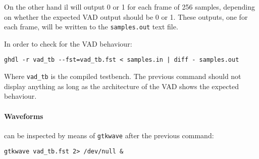 On the other hand il will output 0 or 1 for each frame of 256 samples, depending
on whether the expected VAD output should be 0 or 1. These outputs, one for each
frame, will be written to the \texttt{samples.out} text file.

In order to check for the VAD behaviour:
\begin{verbatim}
ghdl -r vad_tb --fst=vad_tb.fst < samples.in | diff - samples.out
\end{verbatim}
Where \texttt{vad\_tb} is the compiled testbench. The previous command should not
display anything as long as the architecture of the VAD shows the expected
behaviour.

\paragraph{Waveforms} can be inspected by means of \texttt{gtkwave} after
the previous command:
\begin{verbatim}
gtkwave vad_tb.fst 2> /dev/null &
\end{verbatim}
